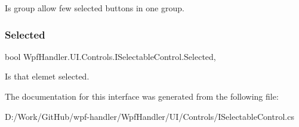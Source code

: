 Is group allow few selected buttons in one group. 

\mbox{\label{interface_wpf_handler_1_1_u_i_1_1_controls_1_1_i_selectable_control_a523969837cfcc2e0ed51b4ee7eccc334}} 
\subsubsection{\texorpdfstring{Selected}{Selected}}
{\footnotesize\ttfamily bool Wpf\+Handler.\+U\+I.\+Controls.\+I\+Selectable\+Control.\+Selected\hspace{0.3cm}{\ttfamily [get]}, {\ttfamily [set]}}



Is that elemet selected. 



The documentation for this interface was generated from the following file\+:\begin{DoxyCompactItemize}
\item 
D\+:/\+Work/\+Git\+Hub/wpf-\/handler/\+Wpf\+Handler/\+U\+I/\+Controls/I\+Selectable\+Control.\+cs\end{DoxyCompactItemize}
